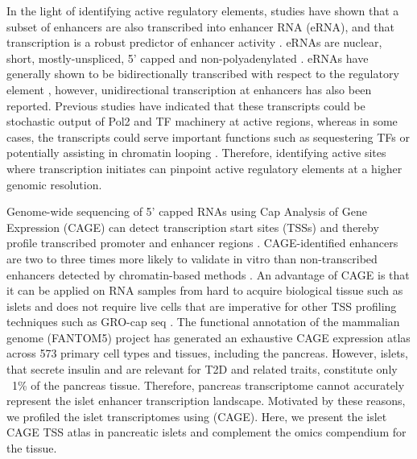 In the light of identifying active regulatory elements, studies have shown that a subset of enhancers are also transcribed into enhancer RNA (eRNA), and that transcription is a robust predictor of enhancer activity \cite{anderssonAtlasActiveEnhancers2014, mikhaylichenkoDegreeEnhancerPromoter2018}. eRNAs are nuclear, short, mostly-unspliced, 5’ capped and non-polyadenylated \cite{anderssonAtlasActiveEnhancers2014}. eRNAs have generally shown to be bidirectionally transcribed with respect to the regulatory element \cite{kimWidespreadTranscriptionNeuronal2010, melgarDiscoveryActiveEnhancers2011, anderssonAtlasActiveEnhancers2014}, however, unidirectional transcription at enhancers has also been reported. Previous studies have indicated that these transcripts could be stochastic output of Pol2 and TF machinery at active regions, whereas in some cases, the transcripts could serve important functions such as sequestering TFs or potentially assisting in chromatin looping  \cite{kaikkonenRemodelingEnhancerLandscape2013, hsiehEnhancerRNAsParticipate2014, liFunctionalRolesEnhancer2013, yangEnhancerRNAdrivenLooping2016a}. Therefore, identifying active sites where transcription initiates can pinpoint active regulatory elements at a higher genomic resolution.
                 
Genome-wide sequencing of 5' capped RNAs using Cap Analysis of Gene Expression (CAGE) can detect transcription start sites (TSSs) and thereby profile transcribed promoter and enhancer regions \cite{kimWidespreadTranscriptionNeuronal2010, anderssonAtlasActiveEnhancers2014}. CAGE-identified enhancers are two to three times more likely to validate in vitro than non-transcribed enhancers detected by chromatin-based methods \cite{anderssonAtlasActiveEnhancers2014}. An advantage of CAGE is that it can be applied on RNA samples from hard to acquire biological tissue such as islets and does not require live cells that are imperative for other TSS profiling techniques such as GRO-cap seq \cite{coreAnalysisNascentRNA2014, coreNascentRNASequencing2008, lopesGROseqToolIdentification2017}. The functional annotation of the mammalian genome (FANTOM5) project \cite{thefantomconsortiumPromoterlevelMammalianExpression2014} has generated an exhaustive CAGE expression atlas across 573 primary cell types and tissues, including the pancreas. However, islets, that secrete insulin and are relevant for T2D and related traits, constitute only ~1\% of the pancreas tissue. Therefore, pancreas transcriptome cannot accurately represent the islet enhancer transcription landscape. Motivated by these reasons, we profiled the islet transcriptomes using (CAGE). Here, we present the islet CAGE TSS atlas in pancreatic islets and complement the omics compendium for the tissue.


